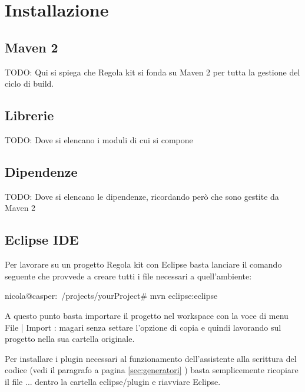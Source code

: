 \chapter{Installazione}\label{chap:installazione}

\section{Maven 2}
TODO: Qui si spiega che Regola kit si fonda su Maven 2 per tutta la gestione del ciclo di build.

\section{Librerie}
TODO: Dove si elencano i moduli di cui si compone

\section{Dipendenze}
TODO: Dove si elencano le dipendenze, ricordando però che sono gestite da Maven 2

\section{Eclipse IDE} 
Per lavorare su un progetto Regola kit con Eclipse basta lanciare il comando seguente che provvede a creare tutti i file necessari a quell'ambiente:

\begin{bash}
nicola@casper:~/projects/yourProject# mvn eclipse:eclipse
\end{bash}

A questo punto basta importare il progetto nel workspace con la voce di menu   File | Import : magari senza settare l'opzione di copia e quindi lavorando sul progetto nella sua cartella originale.

Per installare i plugin necessari al funzionamento dell'assistente alla scrittura del codice (vedi il paragrafo a pagina  \vref{sec:generatori} )  basta semplicemente ricopiare il file ... dentro la cartella eclipse/plugin e riavviare Eclipse.

